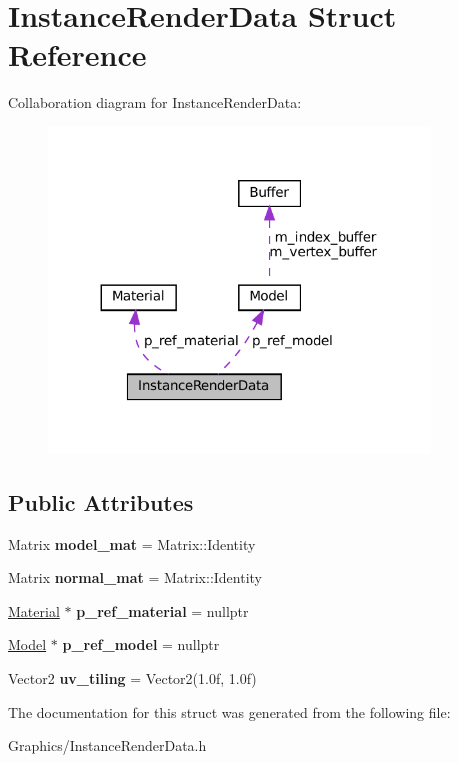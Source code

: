 \hypertarget{structInstanceRenderData}{}\section{Instance\+Render\+Data Struct Reference}
\label{structInstanceRenderData}


Collaboration diagram for Instance\+Render\+Data\+:
\nopagebreak
\begin{figure}[H]
\begin{center}
\leavevmode
\includegraphics[width=287pt]{structInstanceRenderData__coll__graph}
\end{center}
\end{figure}
\subsection*{Public Attributes}
\begin{DoxyCompactItemize}
\item 
\mbox{\label{structInstanceRenderData_abe50189306b675492d73a54297b7cfee}} 
Matrix {\bfseries model\+\_\+mat} = Matrix\+::\+Identity
\item 
\mbox{\label{structInstanceRenderData_a86404a581fce1eed5af67fcea84881a0}} 
Matrix {\bfseries normal\+\_\+mat} = Matrix\+::\+Identity
\item 
\mbox{\label{structInstanceRenderData_aec9fe7c8a861214101ee347d59f7c13d}} 
\hyperlink{classMaterial}{Material} $\ast$ {\bfseries p\+\_\+ref\+\_\+material} = nullptr
\item 
\mbox{\label{structInstanceRenderData_a347fddf4e160c3f764e2802571625177}} 
\hyperlink{classModel}{Model} $\ast$ {\bfseries p\+\_\+ref\+\_\+model} = nullptr
\item 
\mbox{\label{structInstanceRenderData_a1da59961082d990cb3b47c9a82a914bb}} 
Vector2 {\bfseries uv\+\_\+tiling} = Vector2(1.\+0f, 1.\+0f)
\end{DoxyCompactItemize}


The documentation for this struct was generated from the following file\+:\begin{DoxyCompactItemize}
\item 
Graphics/Instance\+Render\+Data.\+h\end{DoxyCompactItemize}
